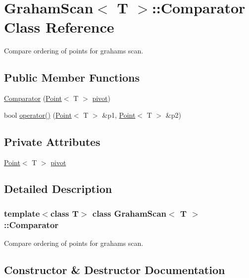 \hypertarget{classGrahamScan_1_1Comparator}{}\section{Graham\+Scan$<$ T $>$\+:\+:Comparator Class Reference}
\label{classGrahamScan_1_1Comparator}


Compare ordering of points for graham\textquotesingle{}s scan.  


\subsection*{Public Member Functions}
\begin{DoxyCompactItemize}
\item 
\mbox{\hyperlink{classGrahamScan_1_1Comparator_ada2c77065f6e3ef65989f1ea5ed68ffa}{Comparator}} (\mbox{\hyperlink{classPoint}{Point}}$<$ T $>$ \mbox{\hyperlink{classGrahamScan_1_1Comparator_ad20dd6c63895a0924c743879f721b4a8}{pivot}})
\item 
bool \mbox{\hyperlink{classGrahamScan_1_1Comparator_a3495ee5d0f1c01f201373b77f71514cb}{operator()}} (\mbox{\hyperlink{classPoint}{Point}}$<$ T $>$ \&p1, \mbox{\hyperlink{classPoint}{Point}}$<$ T $>$ \&p2)
\end{DoxyCompactItemize}
\subsection*{Private Attributes}
\begin{DoxyCompactItemize}
\item 
\mbox{\hyperlink{classPoint}{Point}}$<$ T $>$ \mbox{\hyperlink{classGrahamScan_1_1Comparator_ad20dd6c63895a0924c743879f721b4a8}{pivot}}
\end{DoxyCompactItemize}


\subsection{Detailed Description}
\subsubsection*{template$<$class T$>$\newline
class Graham\+Scan$<$ T $>$\+::\+Comparator}

Compare ordering of points for graham\textquotesingle{}s scan. 

\subsection{Constructor \& Destructor Documentation}
\mbox{\label{classGrahamScan_1_1Comparator_ada2c77065f6e3ef65989f1ea5ed68ffa}} 
